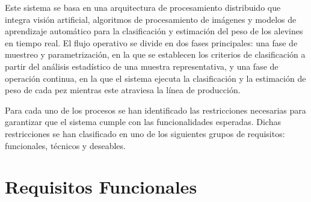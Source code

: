 \documentclass[a4paper,10pt,spanish]{jupyterBook}
\begin{document}
\sphinxAtStartPar
Este sistema se basa en una arquitectura de procesamiento distribuido que integra visión artificial, algoritmos de procesamiento de imágenes y modelos de aprendizaje automático para la clasificación y estimación del peso de los alevines en tiempo real. El flujo operativo se divide en dos fases principales: una fase de muestreo y parametrización, en la que se establecen los criterios de clasificación a partir del análisis estadístico de una muestra representativa, y una fase de operación continua, en la que el sistema ejecuta la clasificación y la estimación de peso de cada pez mientras este atraviesa la línea de producción.

\begin{figure}[htbp]
\centering

\noindent{}
\end{figure}

\sphinxAtStartPar
Para cada uno de los procesos se han identificado las restricciones necesarias para garantizar que el sistema cumple con las funcionalidades esperadas. Dichas restricciones se han clasificado en uno de los siguientes grupos de requisitos: funcionales, técnicos y deseables.


\section{Requisitos Funcionales}
\label{\detokenize{content/01/Requisitos:requisitos-funcionales}}
\end{document}
